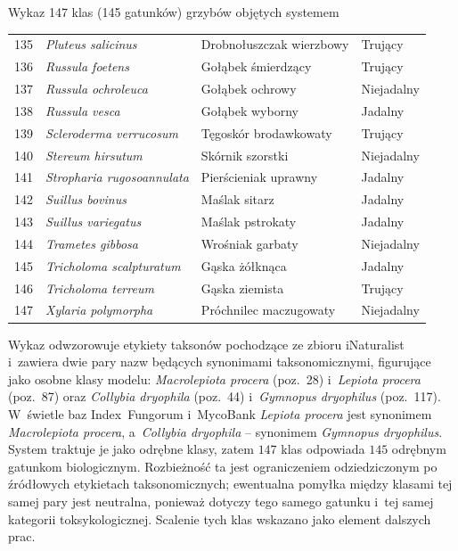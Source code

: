 \begin{easyappendix}{Wykaz 147 klas (145 gatunków) grzybów objętych systemem}
\begin{longtable}{|r|l|l|l|}
135 & \textit{Pluteus salicinus} & Drobnołuszczak wierzbowy & Trujący\\
136 & \textit{Russula foetens} & Gołąbek śmierdzący & Trujący\\
137 & \textit{Russula ochroleuca} & Gołąbek ochrowy & Niejadalny \\
138 & \textit{Russula vesca} & Gołąbek wyborny & Jadalny \\
139 & \textit{Scleroderma verrucosum} & Tęgoskór brodawkowaty & Trujący \\
140 & \textit{Stereum hirsutum} & Skórnik szorstki & Niejadalny \\
141 & \textit{Stropharia rugosoannulata} & Pierścieniak uprawny & Jadalny \\
142 & \textit{Suillus bovinus} & Maślak sitarz & Jadalny \\
143 & \textit{Suillus variegatus} & Maślak pstrokaty & Jadalny \\
144 & \textit{Trametes gibbosa} & Wrośniak garbaty & Niejadalny \\
145 & \textit{Tricholoma scalpturatum} & Gąska żółknąca & Jadalny \\
146 & \textit{Tricholoma terreum} & Gąska ziemista & Trujący\\
147 & \textit{Xylaria polymorpha} & Próchnilec maczugowaty & Niejadalny \\
\hline
\end{longtable}

Wykaz odwzorowuje etykiety taksonów pochodzące ze zbioru iNaturalist \cite{inaturalist} i~zawiera dwie pary nazw będących synonimami taksonomicznymi, figurujące jako osobne klasy modelu: \textit{Macrolepiota procera} (poz.~28) i~\textit{Lepiota procera} (poz.~87) oraz \textit{Collybia dryophila} (poz.~44) i~\textit{Gymnopus dryophilus} (poz.~117). W~świetle baz Index~Fungorum \cite{indexfungorum} i~MycoBank \cite{mycobank} \textit{Lepiota procera} jest synonimem \textit{Macrolepiota procera}, a~\textit{Collybia dryophila} -- synonimem \textit{Gymnopus dryophilus}. System traktuje je jako odrębne klasy, zatem $147$ klas odpowiada $145$ odrębnym gatunkom biologicznym. Rozbieżność ta jest ograniczeniem odziedziczonym po źródłowych etykietach taksonomicznych; ewentualna pomyłka między klasami tej samej pary jest neutralna, ponieważ dotyczy tego samego gatunku i~tej samej kategorii toksykologicznej. Scalenie tych klas wskazano jako element dalszych prac.

\end{easyappendix}


